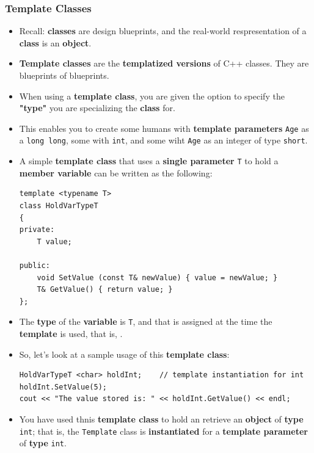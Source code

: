 \documentclass[10pt]{article}
\newcommand{\pbreak}{\vspace{30pt}}
\newcommand{\vocab}[1]{\fbox{\textbf{\textit{#1}}}}
\begin{document}
\subsubsection{Template Classes}
\begin{itemize}
	\item Recall: \textbf{classes} are design blueprints, and the real-world respresentation of a \textbf{class} is an \textbf{object}.

	\item \textbf{Template classes} are the \textbf{templatized versions} of C++ classes. They are blueprints of blueprints.

	\item When using a \textbf{template class}, you are given the option to specify the \textbf{"type"} you are specializing the \textbf{class} for.

	\item This enables you to create some humans with \textbf{template parameters} \verb|Age| as a \verb|long long|, some with \verb|int|, and some wiht \verb|Age| as an integer of type \verb|short|.

		\pbreak

	\item A simple \textbf{template class} that uses a \textbf{single parameter} \verb|T| to hold a \textbf{member variable} can be written as the following:
		\begin{verbatim}
template <typename T>
class HoldVarTypeT
{
private:
	T value;

public:
	void SetValue (const T& newValue) { value = newValue; }
	T& GetValue() { return value; }
};
		\end{verbatim}

	\item The \textbf{type} of the \textbf{variable} is \verb|T|, and that is assigned at the time the \textbf{template} is used, that is, \vocab{instantiated}.

		\pbreak

	\item So, let's look at a sample usage of this \textbf{template class}:
		\begin{verbatim}
HoldVarTypeT <char> holdInt;	// template instantiation for int
holdInt.SetValue(5);
cout << "The value stored is: " << holdInt.GetValue() << endl;
		\end{verbatim}

	\item You have used thnis \textbf{template class} to hold an retrieve an \textbf{object} of \textbf{type} \verb|int|; that is, the \verb|Template| class is \textbf{instantiated} for a \textbf{template parameter} of \textbf{type} \verb|int|.


\end{itemize}
\end{document}
